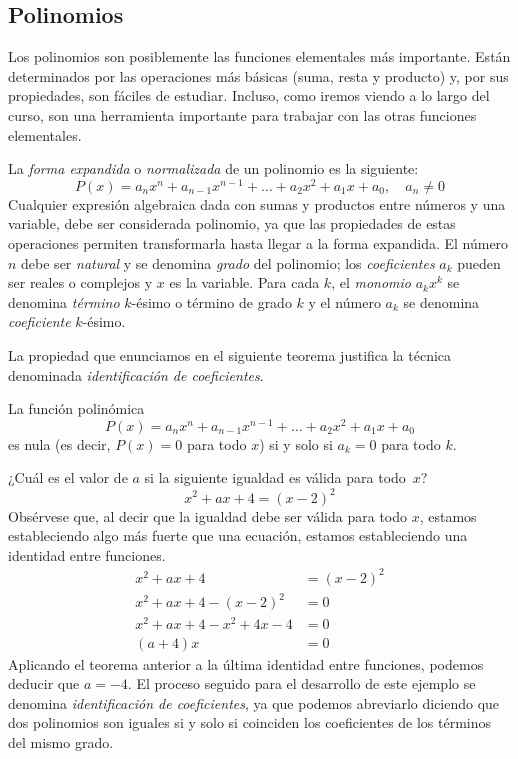 \subsection{Polinomios}

Los polinomios son posiblemente las funciones elementales más importante.
Están determinados por las operaciones más básicas (suma, resta y producto) y, por sus propiedades, son fáciles de estudiar.
Incluso, como iremos viendo a lo largo del curso, son una herramienta importante para trabajar con las otras funciones elementales.

La \emph{forma expandida} o \emph{normalizada} de un polinomio es la siguiente:
%
\[
P(x)=a_nx^n +a_{n-1}x^{n-1}+\dots+ a_2x^2+a_1x+a_0,\quad a_n\ne0
\]
%
Cualquier expresión algebraica dada con sumas y productos entre números y una variable, debe ser considerada polinomio, ya que las propiedades de estas operaciones permiten transformarla hasta llegar a la forma expandida.
El número $n$ debe ser \emph{natural} y se denomina \emph{grado} del polinomio; los \emph{coeficientes} $a_k$ pueden ser reales o complejos y $x$ es la variable.
Para cada $k$, el \emph{monomio} $a_kx^k$ se denomina \emph{término} $k$-ésimo o término de grado $k$ y el número $a_k$ se denomina \emph{coeficiente} $k$-ésimo.

La propiedad que enunciamos en el siguiente teorema justifica la técnica denominada \emph{identificación de coeficientes}.
%
\begin{teorema}\label{th:id-coef}
La función polinómica
\[
P(x)=a_nx^n +a_{n-1}x^{n-1}+\dots+ a_2x^2+a_1x+a_0
\]
es nula (es decir, $P(x)=0$ para todo $x$) si y solo si $a_k=0$  para todo $k$.
\end{teorema}
%
\begin{ejemplo}
¿Cuál es el valor de $a$ si la siguiente igualdad es válida para todo~$x$?
\[
x^2+ax+4 = (x-2)^2
\]
Obsérvese que, al decir que la igualdad debe ser válida para todo $x$, estamos estableciendo algo más fuerte que una ecuación, estamos estableciendo una identidad entre funciones.
\begin{align*}
x^2+ax+4 &= (x-2)^2 \\
x^2+ax+4 - (x-2)^2 &=0\\
x^2+ax+4 - x^2+4x-4 &=0\\
(a+4)x &=0
\end{align*}	
Aplicando el teorema anterior a la última identidad entre funciones, podemos deducir que $a=-4$.
El proceso seguido para el desarrollo de este ejemplo se denomina \emph{identificación de coeficientes}, ya que podemos abreviarlo diciendo que dos polinomios son iguales si y solo si coinciden los coeficientes de los términos del mismo grado.\fej
\end{ejemplo}

